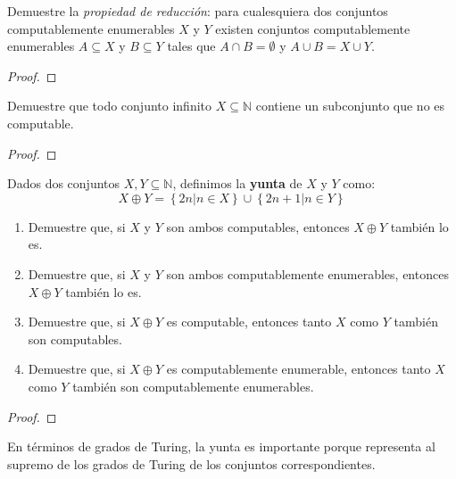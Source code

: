 \documentclass[12pt]{report}
\newcounter{it}
\theoremstyle{largebreak}
\begin{document}
    \begin{excer}
        Demuestre la \textit{propiedad de reducción}: para cualesquiera dos conjuntos computablemente enumerables $X$ y $Y$ existen conjuntos computablemente enumerables $A\subseteq X$ y $B\subseteq Y$ tales que $A\cap B=\emptyset$ y $A\cup B=X\cup Y$. 
    \end{excer}

    \begin{proof}
        
    \end{proof}

    \begin{excer}
        Demuestre que todo conjunto infinito $X\subseteq\mathbb{N}$ contiene un subconjunto que no es computable.
    \end{excer}
    
    \begin{proof}
        
    \end{proof}

    \begin{excer}
        Dados dos conjuntos $X,Y\subseteq\mathbb{N}$, definimos la \textbf{yunta} de $X$ y $Y$ como:
        \begin{equation*}
            X\oplus Y=\left\{2n\Big|n\in X \right\}\cup\left\{2n+1\Big|n\in Y \right\}
        \end{equation*}
        \begin{enumerate}[label = \textit{(\alph*)}]
            \item Demuestre que, si $X$ y $Y$ son ambos computables, entonces $X\oplus Y$ también lo es.
            \item Demuestre que, si $X$ y $Y$ son ambos computablemente enumerables, entonces $X\oplus Y$ también lo es.
            \item Demuestre que, si $X\oplus Y$ es computable, entonces tanto $X$ como $Y$ también son computables.
            \item Demuestre que, si $X\oplus Y$ es computablemente enumerable, entonces tanto $X$ como $Y$ también son computablemente enumerables.
        \end{enumerate}
    \end{excer}

    \begin{proof}
        
    \end{proof}

    \begin{obs}
        En términos de grados de Turing, la yunta es importante porque representa al supremo de los grados de Turing de los conjuntos correspondientes.
    \end{obs}
\end{document}
